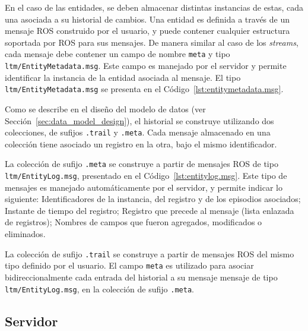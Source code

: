 En el caso de las entidades, se deben almacenar distintas instancias de estas, cada una asociada a su historial de cambios. Una entidad es definida a través de un mensaje ROS construido por el usuario, y puede contener cualquier estructura soportada por ROS para sus mensajes. De manera similar al caso de los \textit{streams}, cada mensaje debe contener un campo de nombre \texttt{meta} y tipo \texttt{ltm/EntityMetadata.msg}. Este campo es manejado por el servidor y permite identificar la instancia de la entidad asociada al mensaje. El tipo \texttt{ltm/EntityMetadata.msg} se presenta en el Código~\ref{lst:entitymetadata.msg}.
\lstset{style=/Style/ROS/MSG}


Como se describe en el diseño del modelo de datos (ver Sección~\ref{sec:data_model_design}), el historial se construye utilizando dos colecciones, de sufijos \texttt{.trail} y \texttt{.meta}. Cada mensaje almacenado en una colección tiene asociado un registro en la otra, bajo el mismo identificador. 

La colección de sufijo \texttt{.meta} se construye a partir de mensajes ROS de tipo \texttt{ltm/EntityLog.msg}, presentado en el Código~\ref{lst:entitylog.msg}. Este tipo de mensajes es manejado automáticamente por el servidor, y permite indicar lo siguiente: Identificadores de la instancia, del registro y de los episodios asociados; Instante de tiempo del registro; Registro que precede al mensaje (lista enlazada de registros); Nombres de campos que fueron agregados, modificados o eliminados.
\lstset{style=/Style/ROS/MSG}


La colección de sufijo \texttt{.trail} se construye a partir de mensajes ROS del mismo tipo definido por el usuario. El campo \texttt{meta} es utilizado para asociar bidireccionalmente cada entrada del historial a su mensaje mensaje de tipo \texttt{ltm/EntityLog.msg}, en la colección de sufijo \texttt{.meta}.
 

\subsection{Servidor}

